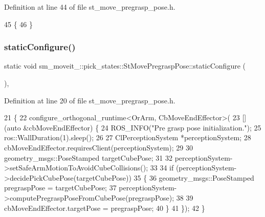 Definition at line 44 of file st\+\_\+move\+\_\+pregrasp\+\_\+pose.\+h.


\begin{DoxyCode}
45             \{
46             \}
\end{DoxyCode}
\mbox{\label{structsm__moveit__4_1_1pick__states_1_1StMovePregraspPose_afb6abd382c1c9f35dd5f74967301cc48}} 
\subsubsection{\texorpdfstring{static\+Configure()}{staticConfigure()}}
{\footnotesize\ttfamily static void sm\+\_\+moveit\+\_\+::pick\+\_\+states\+::\+St\+Move\+Pregrasp\+Pose\+::static\+Configure (\begin{DoxyParamCaption}{ }\end{DoxyParamCaption})\hspace{0.3cm}{\ttfamily [inline]}, {\ttfamily [static]}}



Definition at line 20 of file st\+\_\+move\+\_\+pregrasp\+\_\+pose.\+h.


\begin{DoxyCode}
21             \{
22                 configure\_orthogonal\_runtime<OrArm, CbMoveEndEffector>(
23                     [](\textcolor{keyword}{auto} &cbMoveEndEffector) \{
24                         ROS\_INFO(\textcolor{stringliteral}{"Pre grasp pose initialization."});
25                         ros::WallDuration(1).sleep();
26 
27                         ClPerceptionSystem *perceptionSystem;
28                         cbMoveEndEffector.requiresClient(perceptionSystem);
29 
30                         geometry\_msgs::PoseStamped targetCubePose;
31 
32                         perceptionSystem->setSafeArmMotionToAvoidCubeCollisions();
33 
34                         \textcolor{keywordflow}{if} (perceptionSystem->decidePickCubePose(targetCubePose))
35                         \{
36                             geometry\_msgs::PoseStamped pregraspPose = targetCubePose;
37                             perceptionSystem->computePregraspPoseFromCubePose(pregraspPose);
38 
39                             cbMoveEndEffector.targetPose = pregraspPose;
40                         \}
41                     \});
42             \}
\end{DoxyCode}


